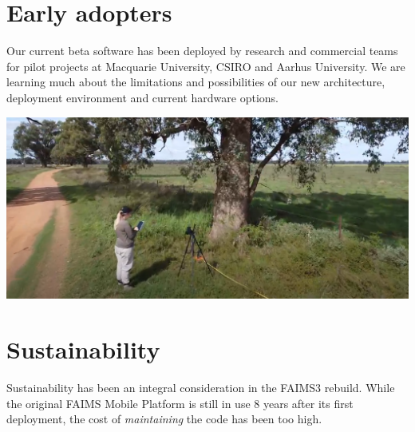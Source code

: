 \documentclass[a0,portrait]{a0poster}
\begin{document}
\begin{multicols}{3}

\section*{Early adopters}

Our current beta software has been deployed by research and commercial teams for pilot projects at Macquarie University, CSIRO and Aarhus University. We are learning much about the limitations and possibilities of our new architecture, deployment environment and current hardware options.

\vspace{.5cm}
\begin{center}
    \includegraphics[width=\linewidth]{figures/Screenshot from 2022-10-13 10-58-35.png}
\end{center}



\section*{Sustainability}
    

Sustainability has been an integral consideration in the FAIMS3 rebuild. While the original FAIMS Mobile Platform is still in use 8 years after its first deployment, the cost of \textit{maintaining} the code has been too high. 




\end{multicols}
\end{document}
